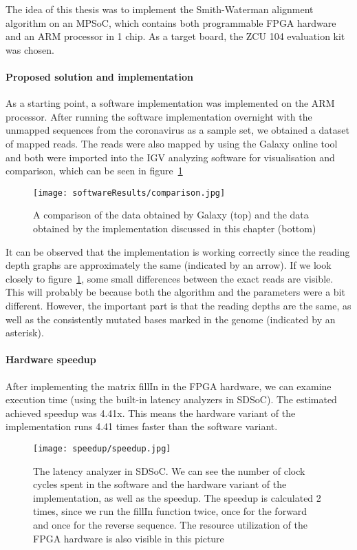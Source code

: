 The idea of this thesis was to implement the Smith-Waterman alignment algorithm on an MPSoC, which contains both programmable FPGA hardware and an ARM processor in 1 chip. As a target board, the ZCU 104 evaluation kit was chosen.

\paragraph{Proposed solution and implementation}

As a starting point, a software implementation was implemented on the ARM processor. After running the software implementation overnight with the unmapped sequences from the coronavirus as a sample set, we obtained a dataset of mapped reads. The reads were also mapped by using the Galaxy online tool~\cite{Galaxy} and both were imported into the IGV analyzing software for visualisation and comparison, which can be seen in figure~\ref{fig:IGVcomparisonConcl}

\begin{figure}[H]
	\centering
	\texttt{[image: softwareResults/comparison.jpg]}
	\caption{A comparison of the data obtained by Galaxy (top) and the data obtained by the implementation discussed in this chapter (bottom)}
	\label{fig:IGVcomparisonConcl}
\end{figure}

It can be observed that the implementation is working correctly since the reading depth graphs are approximately the same (indicated by an arrow). If we look closely to figure~\ref{fig:IGVcomparisonConcl}, some small differences between the exact reads are visible. This will probably be because both the algorithm and the parameters were a bit different. However, the important part is that the reading depths are the same, as well as the consistently mutated bases marked in the genome (indicated by an asterisk).

\paragraph{Hardware speedup}

After implementing the matrix fillIn in the FPGA hardware, we can examine execution time (using the built-in latency analyzers in SDSoC). The estimated achieved speedup was 4.41x. This means the hardware variant of the implementation runs 4.41 times faster than the software variant.

\begin{figure}[H]
	\centering
	\texttt{[image: speedup/speedup.jpg]}
	\caption{The latency analyzer in SDSoC. We can see the number of clock cycles spent in the software and the hardware variant of the implementation, as well as the speedup. The speedup is calculated 2 times, since we run the fillIn function twice, once for the forward and once for the reverse sequence. The resource utilization of the FPGA hardware is also visible in this picture}
	\label{fig:speedupConcl}
\end{figure}





